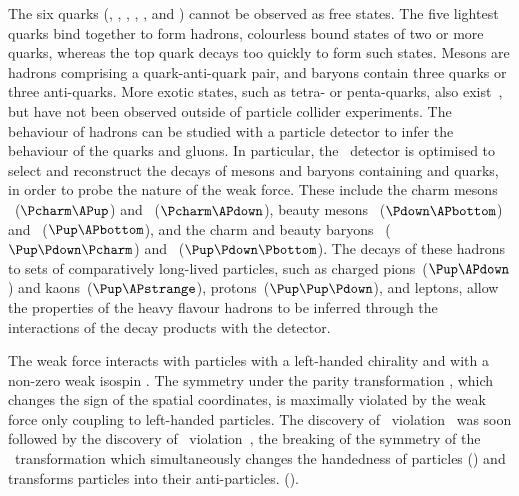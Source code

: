 The six quarks (\Pup, \Pdown, \Pcharm, \Pstrange, \Ptop, and \Pbottom) cannot 
be observed as free states.
The five lightest quarks bind together to form hadrons, colourless bound states 
of two or more quarks, whereas the top quark decays too quickly to form such 
states.
Mesons are hadrons comprising a quark-anti-quark pair, and baryons contain 
three quarks or three anti-quarks.
More exotic states, such as tetra- or penta-quarks, also 
exist~\cite{Choi:2007wga,Aaij:2014jqa,Aaij:2015tga}, but have not been observed 
outside of particle collider experiments.
The behaviour of hadrons can be studied with a particle detector to infer the 
behaviour of the quarks and gluons.
In particular, the \lhcb\ detector is optimised to select and reconstruct the 
decays of mesons and baryons containing \Pcharm and \Pbottom quarks, in order 
to probe the nature of the weak force.
These include the charm mesons \PDzero~($\Pcharm\APup$) and 
\PDp~($\Pcharm\APdown$), beauty mesons \PBzero~($\Pdown\APbottom$) and 
\PBp~($\Pup\APbottom$), and the charm and beauty baryons 
\PLambdac~($\Pup\Pdown\Pcharm$) and \PLambdab~($\Pup\Pdown\Pbottom$).
The decays of these hadrons to sets of comparatively long-lived particles, such 
as charged pions~($\Pup\APdown$) and kaons~($\Pup\APstrange$), 
protons~($\Pup\Pup\Pdown$), and leptons, allow the properties of the heavy 
flavour hadrons to be inferred through the interactions of the decay products 
with the detector.\footnotemark\


The weak force interacts with particles with a left-handed chirality and with a 
non-zero weak isospin \wisospin.
The symmetry under the parity transformation \Ptransform, which changes the 
sign of the spatial coordinates, is maximally violated by the weak force only 
coupling to left-handed particles.
The discovery of \Ptransform\ violation~\cite{Wu:1957my} was soon followed by 
the discovery of \CP\ violation~\cite{Christenson:1964fg}, the breaking of the 
symmetry of the \CP\ transformation which simultaneously changes the handedness 
of particles (\Ptransform) and transforms particles into their anti-particles.  
(\Ctransform).

